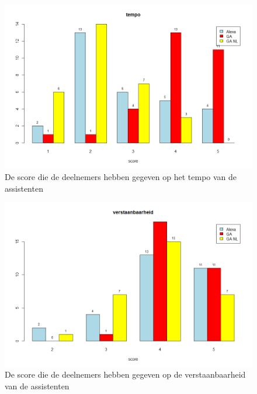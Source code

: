 \begin{figure}[H]
    \centering
    \includegraphics[width=0.9\linewidth]{../onderzoek/onderzoeksresultaten/vergelijking_assistenten_per_eigenschap/barplot/barplot_score_tempo}
    \caption{De score die de deelnemers hebben gegeven op het tempo van de assistenten}
    \label{fig:barplot-tempo}
\end{figure}

\begin{figure}[H]
    \centering
    \includegraphics[width=0.9\linewidth]{../onderzoek/onderzoeksresultaten/vergelijking_assistenten_per_eigenschap/barplot/barplot_score_verstaanbaarheid}
    \caption{De score die de deelnemers hebben gegeven op de verstaanbaarheid van de assistenten}
    \label{fig:barplot-verstaanbaarheid}
\end{figure}

